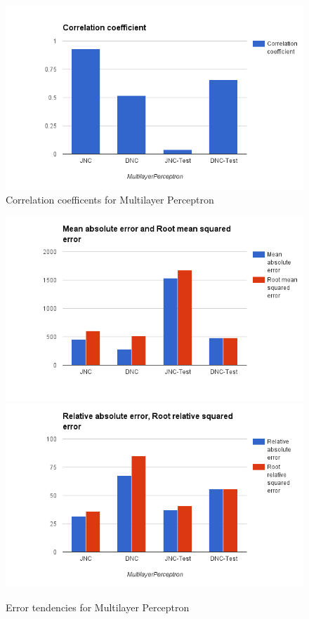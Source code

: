 \begin{figure}[h]
\centering
\includegraphics[scale=0.3]{figures/MP_1.png} 
\caption{Correlation coefficents for Multilayer Perceptron}
\label{fig:correl_mp}
\end{figure}

\begin{figure}[h]
\centering
\includegraphics[scale=0.3]{figures/MP_2.png} 
\includegraphics[scale=0.3]{figures/MP_3.png} 
\caption{Error tendencies for Multilayer Perceptron}
\label{fig:error_mp}
\end{figure}

